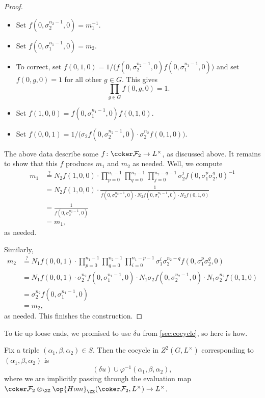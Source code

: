 \documentclass{article}
\begin{document}
\begin{proof}
\begin{itemize}
		\item Set $f\left(0,\sigma_2^{n_2-1},0\right)=m_1^{-1}$.
		\item Set $f\left(0,\sigma_1^{n_1-1},0\right)=m_2$.
		\item To correct, set $f(0,1,0)=1/\big(f\left(0,\sigma_2^{n_2-1},0\right)f\left(0,\sigma_1^{n_1-1},0\right)\big)$ and set $f(0,g,0)=1$ for all other $g\in G$. This gives
		\[\prod_{g\in G}f(0,g,0)=1.\]
		\item Set $f(1,0,0)=f(0,\sigma_1^{n_1-1},0)f(0,1,0)$.
		\item Set $f(0,0,1)=1/\big(\sigma_2f\left(0,\sigma_2^{n_2-1},0\right)\cdot \sigma_2^{n_2}f\left(0,1,0\right)\big)$.
	\end{itemize}
	The above data describe some $f\colon\coker\mathcal F_2\to L^\times$, as discussed above. It remains to show that this $f$ produces $m_1$ and $m_2$ as needed. Well, we compute
	\begin{align*}
		m_1 &\stackrel?= N_2f(1,0,0)\cdot\prod_{p=0}^{n_1-1}\prod_{q=0}^{n_2-1}\prod_{j=0}^{n_2-q-1}\sigma_2^{j}f\left(0,\sigma_1^p\sigma_2^q,0\right)^{-1} \\
		&= N_2f(1,0,0)\cdot\frac1{f\left(0,\sigma_2^{n_2-1},0\right)\cdot N_2f\left(0,\sigma_1^{n_1-1},0\right)\cdot N_2f(0,1,0)} \\
		&= \frac1{f\left(0,\sigma_2^{n_2-1},0\right)} \\
		&= m_1,
	\end{align*}
	as needed.
	
	Similarly,
	\begin{align*}
		m_2 &\stackrel?= N_1f(0,0,1)\cdot\prod_{p=0}^{n_1-1}\prod_{q=0}^{n_2-1}\prod_{i=0}^{n_1-p-1}\sigma_1^i\sigma_2^{n_2-q}f\left(0,\sigma_1^p\sigma_2^q,0\right) \\
		&= N_1f(0,0,1)\cdot \sigma_2^{n_2}f\left(0,\sigma_1^{n_1-1},0\right)\cdot N_1\sigma_2f\left(0,\sigma_2^{n_2-1},0\right)\cdot N_1\sigma_2^{n_2}f\left(0,1,0\right) \\
		&= \sigma_2^{n_2}f\left(0,\sigma_1^{n_1-1},0\right) \\
		&= m_2,
	\end{align*}
	as needed. This finishes the construction.
\end{proof}
To tie up loose ends, we promised to use $\delta u$ from \autoref{sec:cocycle}, so here is how.
\begin{proposition}
	Fix a triple $(\alpha_1,\beta,\alpha_2)\in S$. Then the cocycle in $Z^2(G,L^\times)$ corresponding to $(\alpha_1,\beta,\alpha_2)$ is
	\[(\delta u)\cup\varphi^{-1}(\alpha_1,\beta,\alpha_2),\]
	where we are implicitly passing through the evaluation map $\coker\mathcal F_2\otimes_{\ZZ}\op{Hom}_\ZZ(\coker\mathcal F_2,L^\times)\to L^\times$.
\end{proposition}
\end{document}
